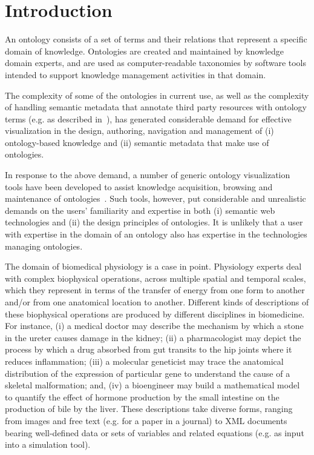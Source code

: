 \section{Introduction}                                                                   %

An ontology consists of a set of terms and their relations that represent a specific domain of knowledge. Ontologies are created and maintained by knowledge domain experts, and are used as computer-readable taxonomies by software tools intended to support knowledge management activities in that domain.

The complexity of some of the ontologies in current use, as well as the complexity of handling semantic metadata that annotate third party resources with ontology terms (e.g. as described in~\cite{BHW+11}), has generated considerable demand for effective visualization in the design, authoring, navigation and management of (i) ontology-based knowledge and (ii) semantic metadata that make use of ontologies.

In response to the above demand, a number of generic ontology visualization tools have been developed to assist knowledge acquisition, browsing and maintenance of ontologies~\cite{KHL+07}. Such tools, however, put considerable and unrealistic demands on the users' familiarity and expertise in both (i) semantic web technologies and (ii) the design principles of ontologies. It is unlikely that a user with expertise in the domain of an ontology also has expertise in the technologies managing ontologies.

The domain of biomedical physiology is a case in point. Physiology experts deal with complex biophysical operations, across multiple spatial and temporal scales, which they represent in terms of the transfer of energy from one form to another and/or from one anatomical location to another. Different kinds of descriptions of these biophysical operations are produced by different disciplines in biomedicine. For instance, (i) a medical doctor may describe the mechanism by which a stone in the ureter causes damage in the kidney; (ii) a pharmacologist may depict the process by which a drug absorbed from gut transits to the hip joints where it reduces inflammation; (iii) a molecular geneticist may trace the anatomical distribution of the expression of particular gene to understand the cause of a skeletal malformation; and, (iv) a bioengineer may build a mathematical model to quantify the effect of hormone production by the small intestine on the production of bile by the liver. These descriptions take diverse forms, ranging from images and free text (e.g. for a paper in a journal) to XML documents bearing well-defined data or sets of variables and related equations (e.g. as input into a simulation tool).

